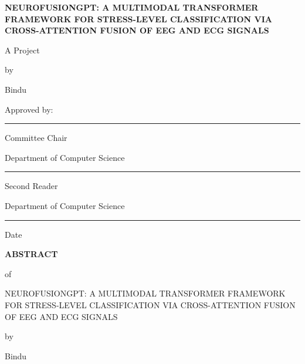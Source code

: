 \documentclass[12pt,letterpaper]{report}
\begin{document}
\clearpage
\thispagestyle{empty}
\begin{center}
\vspace*{0.5in}

{\large\bfseries NEUROFUSIONGPT: A MULTIMODAL TRANSFORMER FRAMEWORK FOR STRESS-LEVEL CLASSIFICATION VIA CROSS-ATTENTION FUSION OF EEG AND ECG SIGNALS}

\vspace{0.5in}

A Project

by

Bindu

\vspace{1in}

Approved by:

\vspace{0.75in}

\rule{3.5in}{0.5pt}

Committee Chair

Department of Computer Science

\vspace{0.75in}

\rule{3.5in}{0.5pt}

Second Reader

Department of Computer Science

\vspace{0.75in}

\rule{3.5in}{0.5pt}

Date

\end{center}

\clearpage
\begin{center}
{\large\bfseries ABSTRACT}

\vspace{0.25in}

of

\vspace{0.25in}

NEUROFUSIONGPT: A MULTIMODAL TRANSFORMER FRAMEWORK FOR STRESS-LEVEL CLASSIFICATION VIA CROSS-ATTENTION FUSION OF EEG AND ECG SIGNALS

\vspace{0.25in}

by

\vspace{0.25in}

Bindu

\end{center}
\end{document}
